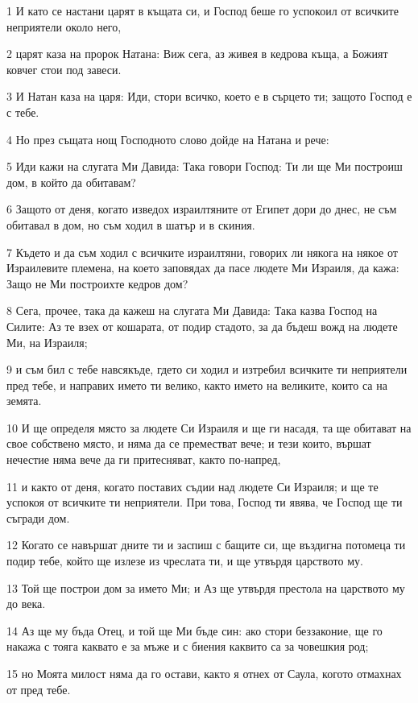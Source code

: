 \par 1 И като се настани царят в къщата си, и Господ беше го успокоил от всичките неприятели около него,
\par 2 царят каза на пророк Натана: Виж сега, аз живея в кедрова къща, а Божият ковчег стои под завеси.
\par 3 И Натан каза на царя: Иди, стори всичко, което е в сърцето ти; защото Господ е с тебе.
\par 4 Но през същата нощ Господното слово дойде на Натана и рече:
\par 5 Иди кажи на слугата Ми Давида: Така говори Господ: Ти ли ще Ми построиш дом, в който да обитавам?
\par 6 Защото от деня, когато изведох израилтяните от Египет дори до днес, не съм обитавал в дом, но съм ходил в шатър и в скиния.
\par 7 Където и да съм ходил с всичките израилтяни, говорих ли някога на някое от Израилевите племена, на което заповядах да пасе людете Ми Израиля, да кажа: Защо не Ми построихте кедров дом?
\par 8 Сега, прочее, така да кажеш на слугата Ми Давида: Така казва Господ на Силите: Аз те взех от кошарата, от подир стадото, за да бъдеш вожд на людете Ми, на Израиля;
\par 9 и съм бил с тебе навсякъде, гдето си ходил и изтребил всичките ти неприятели пред тебе, и направих името ти велико, както името на великите, които са на земята.
\par 10 И ще определя място за людете Си Израиля и ще ги насадя, та ще обитават на свое собствено място, и няма да се преместват вече; и тези които, вършат нечестие няма вече да ги притесняват, както по-напред,
\par 11 и както от деня, когато поставих съдии над людете Си Израиля; и ще те успокоя от всичките ти неприятели. При това, Господ ти явява, че Господ ще ти съгради дом.
\par 12 Когато се навършат дните ти и заспиш с бащите си, ще въздигна потомеца ти подир тебе, който ще излезе из чреслата ти, и ще утвърдя царството му.
\par 13 Той ще построи дом за името Ми; и Аз ще утвърдя престола на царството му до века.
\par 14 Аз ще му бъда Отец, и той ще Ми бъде син: ако стори беззаконие, ще го накажа с тояга каквато е за мъже и с биения каквито са за човешкия род;
\par 15 но Моята милост няма да го остави, както я отнех от Саула, когото отмахнах от пред тебе.
